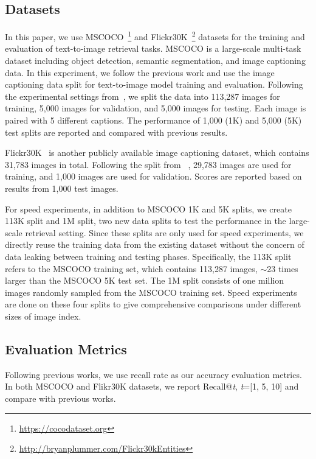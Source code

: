 \subsection{Datasets}
In this paper, we use MSCOCO~\cite{lin2014microsoft}\footnote{\url{https://cocodataset.org}} and Flickr30K~\cite{plummer2015flickr30k}\footnote{\url{http://bryanplummer.com/Flickr30kEntities}} datasets for the training and evaluation of text-to-image retrieval tasks. MSCOCO is a large-scale multi-task dataset including object detection, semantic segmentation, and image captioning data. In this experiment, we follow the previous work and use the image captioning data split for text-to-image model training and evaluation. Following the experimental settings from~\citet{karpathy2015deep}, we split the data into 113,287 images for training, 5,000 images for validation, and 5,000 images for testing. Each image is paired with 5 different captions. The performance of 1,000 (1K) and 5,000 (5K) test splits are reported and compared with previous results.

Flickr30K~\cite{plummer2015flickr30k} is another publicly available image captioning dataset, which contains 31,783 images in total. Following the split from ~\citet{karpathy2015deep}, 29,783 images are used for training, and 1,000 images are used for validation. Scores are reported based on results from 1,000 test images. 

For speed experiments, in addition to MSCOCO 1K and 5K splits, we create 113K split and 1M split, two new data splits to test the performance in the large-scale retrieval setting. Since these splits are only used for speed experiments, we directly reuse the training data from the existing dataset without the concern of data leaking between training and testing phases. Specifically, the 113K split refers to the MSCOCO training set, which contains 113,287 images, $\sim$23 times larger than the MSCOCO 5K test set. The 1M split consists of one million images randomly sampled from the MSCOCO training set. Speed experiments are done on these four splits to give comprehensive comparisons under different sizes of image index.


\subsection{Evaluation Metrics}
\label{sec:visualsparta-metrics}
Following previous works, we use recall rate as our accuracy evaluation metrics. In both MSCOCO and Flikr30K datasets, we report Recall@\textit{t}, \textit{t}=[1, 5, 10] and compare with previous works. 

